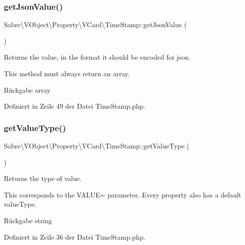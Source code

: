 \subsubsection{\texorpdfstring{get\+Json\+Value()}{getJsonValue()}}
{\footnotesize\ttfamily Sabre\textbackslash{}\+V\+Object\textbackslash{}\+Property\textbackslash{}\+V\+Card\textbackslash{}\+Time\+Stamp\+::get\+Json\+Value (\begin{DoxyParamCaption}{ }\end{DoxyParamCaption})}

Returns the value, in the format it should be encoded for json.

This method must always return an array.

\begin{DoxyReturn}{Rückgabe}
array 
\end{DoxyReturn}


Definiert in Zeile 49 der Datei Time\+Stamp.\+php.

\mbox{\label{class_sabre_1_1_v_object_1_1_property_1_1_v_card_1_1_time_stamp_ac8539217895b63c3ebe14efd4e82baa9}} 
\subsubsection{\texorpdfstring{get\+Value\+Type()}{getValueType()}}
{\footnotesize\ttfamily Sabre\textbackslash{}\+V\+Object\textbackslash{}\+Property\textbackslash{}\+V\+Card\textbackslash{}\+Time\+Stamp\+::get\+Value\+Type (\begin{DoxyParamCaption}{ }\end{DoxyParamCaption})}

Returns the type of value.

This corresponds to the V\+A\+L\+UE= parameter. Every property also has a \textquotesingle{}default\textquotesingle{} value\+Type.

\begin{DoxyReturn}{Rückgabe}
string 
\end{DoxyReturn}


Definiert in Zeile 36 der Datei Time\+Stamp.\+php.

